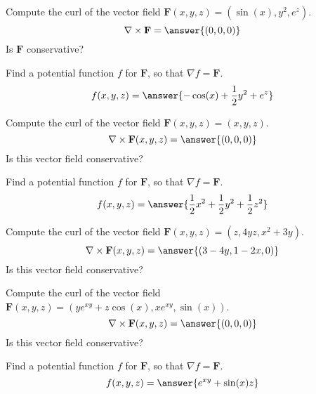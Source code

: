 \documentclass{ximera}
\begin{document}
\begin{problem}
Compute the curl of the vector field $\mathbf{F}(x,y,z) = (\sin(x), y^2, e^z)$.
\[
\nabla\times\mathbf{F} = \answer{(0,0,0)}
\]
Is $\mathbf{F}$ conservative?
\begin{multipleChoice}
\end{multipleChoice}
\begin{problem}
Find a potential function $f$ for $\mathbf{F}$, so that $\nabla f = \mathbf{F}$.
\[
f(x,y,z) = \answer{-\cos(x)+\frac{1}{2}y^2+e^z}
\]
\end{problem}
\end{problem}

\begin{problem}
Compute the curl of the vector field $\mathbf{F}(x,y,z) = (x,y,z)$.
\[
\nabla\times\mathbf{F}(x,y,z) = \answer{(0,0,0)}
\]
Is this vector field conservative?
\begin{multipleChoice}
\end{multipleChoice}
\begin{problem}
Find a potential function $f$ for $\mathbf{F}$, so that $\nabla f = \mathbf{F}$.
\[
f(x,y,z) = \answer{\frac{1}{2}x^2+\frac{1}{2}y^2+\frac{1}{2}z^2}
\]
\end{problem}
\end{problem}

\begin{problem}
Compute the curl of the vector field $\mathbf{F}(x,y,z) = (z,4yz,x^2+3y)$.
\[
\nabla\times\mathbf{F}(x,y,z) = \answer{(3-4y,1-2x,0)}
\]
Is this vector field conservative?
\begin{multipleChoice}
\end{multipleChoice}
\end{problem}

\begin{problem}
Compute the curl of the vector field $\mathbf{F}(x,y,z) = (ye^{xy}+z\cos(x), xe^{xy},\sin(x))$.
\[
\nabla\times\mathbf{F}(x,y,z) = \answer{(0,0,0)}
\]
Is this vector field conservative?
\begin{multipleChoice}
\end{multipleChoice}
\begin{problem}
Find a potential function $f$ for $\mathbf{F}$, so that $\nabla f = \mathbf{F}$.
\[
f(x,y,z) = \answer{e^{xy}+\sin(x)z}
\]
\end{problem}
\end{problem}
\end{document}
